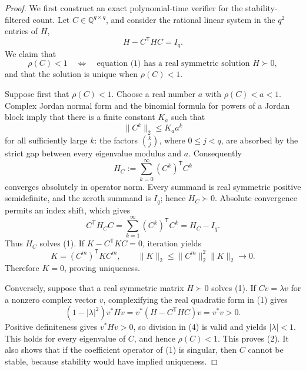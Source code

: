 \documentclass{article}
\begin{document}
\begin{proof}
We first construct an exact polynomial-time verifier for the stability-filtered count. Let \(C\in\mathbb Q^{q\times q}\), and consider the rational linear system in the \(q^2\) entries of \(H\),
\[
 H-C^{\mathsf T}HC=I_q. \tag{1}
\]
We claim that
\[
 \rho(C)<1
 \quad\Longleftrightarrow\quad
 \text{equation (1) has a real symmetric solution \(H\succ0\)}, \tag{2}
\]
and that the solution is unique when \(\rho(C)<1\).

Suppose first that \(\rho(C)<1\). Choose a real number \(a\) with \(\rho(C)<a<1\). Complex Jordan normal form and the binomial formula for powers of a Jordan block imply that there is a finite constant \(K_a\) such that
\[
 \lVert C^k\rVert_2\leq K_a a^k
\]
for all sufficiently large \(k\): the factors \(\binom{k}{j}\), where \(0\leq j<q\), are absorbed by the strict gap between every eigenvalue modulus and \(a\). Consequently
\[
 H_C:=\sum_{k=0}^{\infty}(C^k)^{\mathsf T}C^k \tag{3}
\]
converges absolutely in operator norm. Every summand is real symmetric positive semidefinite, and the zeroth summand is \(I_q\); hence \(H_C\succ0\). Absolute convergence permits an index shift, which gives
\[
 C^{\mathsf T}H_CC
 =\sum_{k=1}^{\infty}(C^k)^{\mathsf T}C^k
 =H_C-I_q.
\]
Thus \(H_C\) solves (1). If \(K-C^{\mathsf T}KC=0\), iteration yields
\[
 K=(C^m)^{\mathsf T}KC^m,
 \qquad
 \lVert K\rVert_2
 \leq \lVert C^m\rVert_2^2\lVert K\rVert_2
 \longrightarrow0.
\]
Therefore \(K=0\), proving uniqueness.

Conversely, suppose that a real symmetric matrix \(H\succ0\) solves (1). If \(Cv=\lambda v\) for a nonzero complex vector \(v\), complexifying the real quadratic form in (1) gives
\[
 (1-|\lambda|^2)v^*Hv
 =v^*(H-C^{\mathsf T}HC)v
 =v^*v>0. \tag{4}
\]
Positive definiteness gives \(v^*Hv>0\), so division in (4) is valid and yields \(|\lambda|<1\). This holds for every eigenvalue of \(C\), and hence \(\rho(C)<1\). This proves (2). It also shows that if the coefficient operator of (1) is singular, then \(C\) cannot be stable, because stability would have implied uniqueness.


\end{proof}
\end{document}
